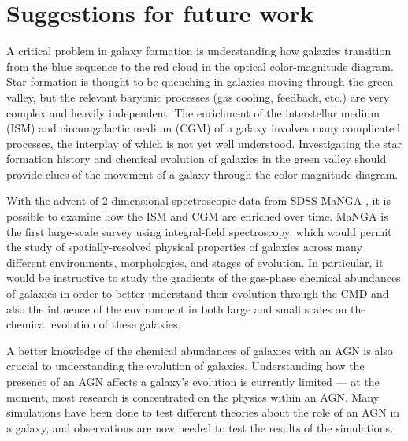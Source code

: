 \section[Future work]{Suggestions for future work}



A critical problem in galaxy formation is understanding how galaxies transition 
from the blue sequence to the red cloud in the optical color-magnitude diagram.  
Star formation is thought to be quenching in galaxies moving through the green 
valley, but the relevant baryonic processes (gas cooling, feedback, etc.) are 
very complex and heavily independent.  The enrichment of the interstellar medium 
(ISM) and circumgalactic medium (CGM) of a galaxy involves many complicated 
processes, the interplay of which is not yet well understood.  Investigating the 
star formation history and chemical evolution of galaxies in the green valley 
should provide clues of the movement of a galaxy through the color-magnitude 
diagram.

With the advent of 2-dimensional spectroscopic data from SDSS MaNGA \citep{MaNGA,
SDSS13}, it is possible to examine how the ISM and CGM are enriched over time.  
MaNGA is the first large-scale survey using integral-field spectroscopy, which 
would permit the study of spatially-resolved physical properties of galaxies 
across many different environments, morphologies, and stages of evolution.  In 
particular, it would be instructive to study the gradients of the gas-phase 
chemical abundances of galaxies in order to better understand their evolution 
through the CMD and also the influence of the environment in both large and 
small scales on the chemical evolution of these galaxies.

A better knowledge of the chemical abundances of galaxies with an AGN is also 
crucial to understanding the evolution of galaxies.  Understanding how the 
presence of an AGN affects a galaxy's evolution is currently limited --- at the 
moment, most research is concentrated on the physics within an AGN.  Many 
simulations have been done to test different theories about the role of an AGN 
in a galaxy, and observations are now needed to test the results of the 
simulations.


